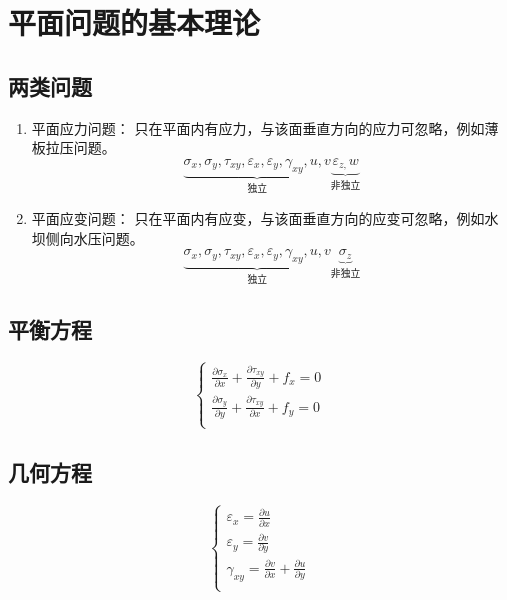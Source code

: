 \section{平面问题的基本理论}
\subsection{两类问题}
\begin{enumerate}
	\item 平面应力问题： 只在平面内有应力，与该面垂直方向的应力可忽略，例如薄板拉压问题。\[\underset{\text{独立}}{\underbrace{\sigma _x,\sigma _y,\tau _{xy},\varepsilon _x,\varepsilon _y,\gamma _{xy},u,v}}\underset{\text{非独立}}{\underbrace{\varepsilon _{z,}w}}\]
	\item 平面应变问题： 只在平面内有应变，与该面垂直方向的应变可忽略，例如水坝侧向水压问题。\[\underset{\text{独立}}{\underbrace{\sigma _x,\sigma _y,\tau _{xy},\varepsilon _x,\varepsilon _y,\gamma _{xy},u,v}}\underset{\text{非独立}}{\underbrace{\sigma _z}}\]
\end{enumerate}

\subsection{平衡方程}
\begin{equation}
	\begin{cases}
	\frac{\partial \sigma _x}{\partial x}+\frac{\partial \tau _{xy}}{\partial y}+f_x=0\\
	\frac{\partial \sigma _y}{\partial y}+\frac{\partial \tau _{xy}}{\partial x}+f_y=0\\
	\end{cases}
\end{equation}

\subsection{几何方程}
\begin{equation}
	\begin{cases}
	\varepsilon _x=\frac{\partial u}{\partial x}\\
	\varepsilon _y=\frac{\partial v}{\partial y}\\
	\gamma _{xy}=\frac{\partial v}{\partial x}+\frac{\partial u}{\partial y}\\
	\end{cases}
\end{equation}

